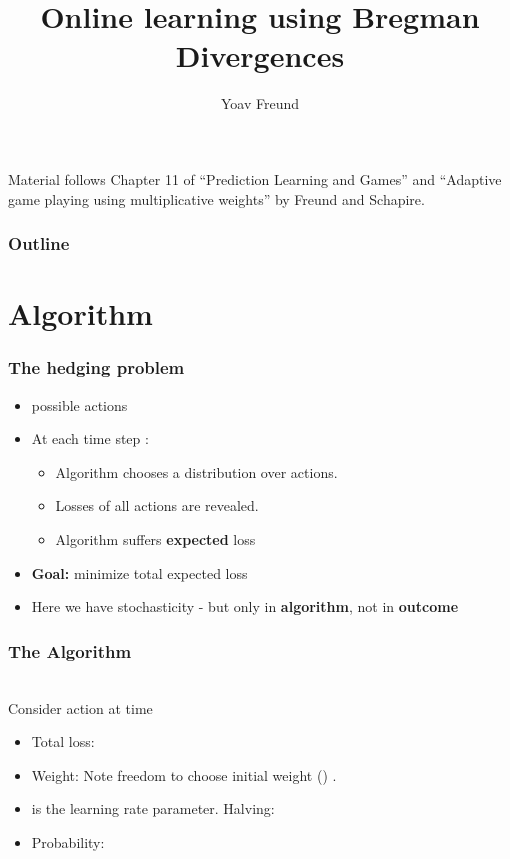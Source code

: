 \documentclass{beamer}
\title[\ouralg] %
{Online learning using Bregman Divergences}
\author[Freund] %
{Yoav Freund}
\institute[Universities of Somewhere and Elsewhere] %
\begin{document}

\begin{frame}
  \titlepage
  \begin{small}
    Material follows Chapter 11 of ``Prediction Learning and
    Games'' and ``Adaptive game playing using multiplicative weights''
    by Freund and Schapire.
  \end{small}
\end{frame}

\begin{frame}
  \frametitle{Outline}
  \tableofcontents[pausesections]
\end{frame}


\section{\ouralg Algorithm}

\begin{frame}
\frametitle{The hedging problem}

\begin{itemize}
\item {} possible actions 

\item At each time step :
\begin{itemize}
\item Algorithm chooses a distribution  over actions.
\item Losses  of all actions  are revealed.
\item Algorithm suffers {\bf expected} loss 
\end{itemize}
\item {{\bf Goal:} minimize total expected loss}
\item {Here we have stochasticity - but only in {\bf algorithm}, not in {\bf outcome}}
\end{itemize}
\end{frame}

\begin{frame}
\frametitle{The \ouralg Algorithm}
~\\
Consider action  at time 
\begin{itemize}
\item Total loss:
\item Weight:
Note freedom to choose initial weight ()
.
\item
{} is the learning rate parameter. Halving: \R{$\eta \to \infty$}

\item Probability:
\end{itemize}
\end{frame}
\end{document}
